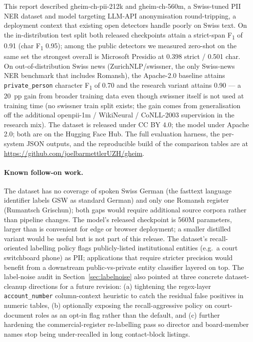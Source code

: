 \documentclass[sigconf,nonacm]{acmart}
\begin{document}
This report described \textsf{gheim-ch-pii-212k} and
\textsf{gheim-ch-560m}, a Swiss-tuned PII NER dataset and model
targeting LLM-API anonymisation round-tripping, a deployment
context that existing open detectors handle poorly on Swiss text.
On the in-distribution test split both released checkpoints attain
a strict-span F\textsubscript{1} of 0.91 (char F\textsubscript{1}
0.95); among the public detectors we measured zero-shot on the
same set the strongest overall is Microsoft Presidio at 0.398
strict / 0.501 char. On out-of-distribution Swiss news
(\textsf{ZurichNLP/swissner}, the only Swiss-news NER benchmark that
includes Romansh), the Apache-2.0 baseline attains
\texttt{private\_person} character F\textsubscript{1} of 0.70 and
the research variant attains 0.90 — a 20~pp gain from broader
training data even though swissner itself is not used at training
time (no swissner train split exists; the gain comes from
generalisation off the additional openpii-1m / WikiNeural /
CoNLL-2003 supervision in the research mix). The dataset is released under
CC BY 4.0; the model under Apache 2.0; both are on the Hugging Face
Hub. The full evaluation harness, the per-system JSON outputs, and
the reproducible build of the comparison tables are at
\url{https://github.com/joelbarmettlerUZH/gheim}.

\paragraph{Known follow-on work.} The dataset has no coverage of
spoken Swiss German (the fasttext language identifier labels GSW as
standard German) and only one Romansh register (Rumantsch Grischun);
both gaps would require additional source corpora rather than
pipeline changes. The model's released checkpoint is 560M
parameters, larger than is convenient for edge or browser
deployment; a smaller distilled variant would be useful but is
not part of this release. The dataset's recall-oriented labelling
policy flags publicly-listed institutional entities (e.g.\ a court
switchboard phone) as PII; applications that require stricter
precision would benefit from a downstream public-vs-private entity
classifier layered on top. The label-noise audit in
Section~\ref{sec:labelnoise} also pointed at three concrete
dataset-cleanup directions for a future revision: (a) tightening
the regex-layer \texttt{account\_number} column-context heuristic
to catch the residual false positives in numeric tables, (b)
optionally exposing the recall-aggressive policy on court-document
roles as an opt-in flag rather than the default, and (c) further
hardening the commercial-register re-labelling pass so director
and board-member names stop being under-recalled in long
contact-block listings.
\end{document}
